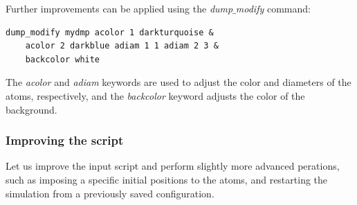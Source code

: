 \documentclass[9pt,tutorial]{livecoms}
\begin{document}
Further improvements can be applied using the \textit{dump$\_$modify} command:
{\normalsize \begin{verbatim}
dump_modify mydmp acolor 1 darkturquoise &
    acolor 2 darkblue adiam 1 1 adiam 2 3 &
    backcolor white
\end{verbatim}}
The \textit{acolor} and \textit{adiam} keywords are used to adjust the color and diameters of the atoms, respectively, and the \textit{backcolor} keyword adjusts the color of the background.

\subsubsection{Improving the script}

Let us improve the input script and perform slightly more advanced perations, such as imposing a specific initial positions to the atoms, and restarting the simulation from a previously saved configuration.
\end{document}
